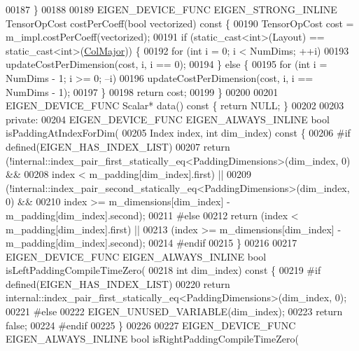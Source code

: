 \begin{DoxyCode}
00187   \}
00188 
00189   EIGEN\_DEVICE\_FUNC EIGEN\_STRONG\_INLINE TensorOpCost costPerCoeff(\textcolor{keywordtype}{bool} vectorized)\textcolor{keyword}{ const }\{
00190     TensorOpCost cost = m\_impl.costPerCoeff(vectorized);
00191     \textcolor{keywordflow}{if} (static\_cast<int>(Layout) == static\_cast<int>(\hyperlink{group__enums_ggaacded1a18ae58b0f554751f6cdf9eb13a0cbd4bdd0abcfc0224c5fcb5e4f6669a}{ColMajor})) \{
00192       \textcolor{keywordflow}{for} (\textcolor{keywordtype}{int} i = 0; i < NumDims; ++i)
00193         updateCostPerDimension(cost, i, i == 0);
00194     \} \textcolor{keywordflow}{else} \{
00195       \textcolor{keywordflow}{for} (\textcolor{keywordtype}{int} i = NumDims - 1; i >= 0; --i)
00196         updateCostPerDimension(cost, i, i == NumDims - 1);
00197     \}
00198     \textcolor{keywordflow}{return} cost;
00199   \}
00200 
00201   EIGEN\_DEVICE\_FUNC Scalar* data()\textcolor{keyword}{ const }\{ \textcolor{keywordflow}{return} NULL; \}
00202 
00203  \textcolor{keyword}{private}:
00204   EIGEN\_DEVICE\_FUNC EIGEN\_ALWAYS\_INLINE \textcolor{keywordtype}{bool} isPaddingAtIndexForDim(
00205       Index index, \textcolor{keywordtype}{int} dim\_index)\textcolor{keyword}{ const }\{
00206 \textcolor{preprocessor}{#if defined(EIGEN\_HAS\_INDEX\_LIST)}
00207     \textcolor{keywordflow}{return} (!internal::index\_pair\_first\_statically\_eq<PaddingDimensions>(dim\_index, 0) &&
00208             index < m\_padding[dim\_index].first) ||
00209         (!internal::index\_pair\_second\_statically\_eq<PaddingDimensions>(dim\_index, 0) &&
00210          index >= m\_dimensions[dim\_index] - m\_padding[dim\_index].second);
00211 \textcolor{preprocessor}{#else}
00212     \textcolor{keywordflow}{return} (index < m\_padding[dim\_index].first) ||
00213            (index >= m\_dimensions[dim\_index] - m\_padding[dim\_index].second);
00214 \textcolor{preprocessor}{#endif}
00215   \}
00216 
00217   EIGEN\_DEVICE\_FUNC EIGEN\_ALWAYS\_INLINE \textcolor{keywordtype}{bool} isLeftPaddingCompileTimeZero(
00218       \textcolor{keywordtype}{int} dim\_index)\textcolor{keyword}{ const }\{
00219 \textcolor{preprocessor}{#if defined(EIGEN\_HAS\_INDEX\_LIST)}
00220     \textcolor{keywordflow}{return} internal::index\_pair\_first\_statically\_eq<PaddingDimensions>(dim\_index, 0);
00221 \textcolor{preprocessor}{#else}
00222     EIGEN\_UNUSED\_VARIABLE(dim\_index);
00223     \textcolor{keywordflow}{return} \textcolor{keyword}{false};
00224 \textcolor{preprocessor}{#endif}
00225   \}
00226 
00227   EIGEN\_DEVICE\_FUNC EIGEN\_ALWAYS\_INLINE \textcolor{keywordtype}{bool} isRightPaddingCompileTimeZero(

\end{DoxyCode}

